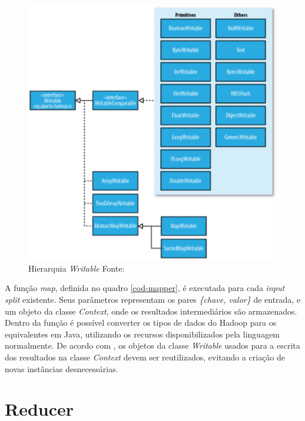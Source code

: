 \begin{figure}[ht!]
	\centering
	\includegraphics[keepaspectratio=true,scale=0.5]
	  {figuras/hadoop-writable.eps}
	\caption[Hierarquia \textit{Writable}]{Hierarquia \textit{Writable}
	\protect\linebreak Fonte: \cite{white2012}}
	\label{fig-writable}
\end{figure}
\FloatBarrier

A função \textit{map}, definida no quadro \ref{cod-mapper}, é executada para cada \textit{input split} existente. Seus parâmetros representam os pares \textit{\{chave, valor\}} de entrada, e um objeto da classe \textit{Context}, onde os resultados intermediários são armazenados. Dentro da função é possível converter os tipos de dados do Hadoop para os equivalentes em Java, utilizando os recursos disponibilizados pela linguagem normalmente. De acordo com , os objetos da classe \textit{Writable} usados para a escrita dos resultados na classe \textit{Context} devem ser reutilizados, evitando a criação de novas instâncias desnecessárias.

\section{Reducer}

